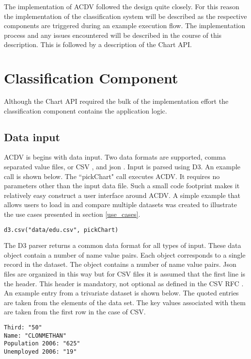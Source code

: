 \documentclass[a4paper, 11pt, titlepage, onehalfspacing]{report}
\begin{document}
The implementation of AC\lightning{}DV followed the design quite closely. For this reason the implementation of the classification system will be described as the respective components are triggered during an example execution flow. The implementation process and any issues encountered will be described in the course of this description. This is followed by a description of the Chart API.

\section{Classification Component}
Although the Chart API required the bulk of the implementation effort the classification component contains the application logic.

\subsection{Data input}
AC\lightning{}DV is begins with data input. Two data formats are supported, comma separated value files, or CSV \cite{csv}, and json \cite{json}. Input is parsed using D3. An example call is shown below. The ``pickChart" call executes AC\lightning{}DV. It requires no parameters other than the input data file. Such a small code footprint makes it relatively easy construct a user interface around AC\lightning{}DV. A simple example that allows users to load in and compare multiple datasets was created to illustrate the use cases presented in section \ref{use_cases}. 

\begin{verbatim}
d3.csv("data/edu.csv", pickChart)
\end{verbatim}

The D3 parser returns a common data format for all types of input. These data object contain a number of name value pairs. Each object corresponds to a single record in the dataset. The object contains a number of name value pairs. Json files are organized in this way but for CSV files it is assumed that the first line is the header. This header is mandatory, not optional as defined in the CSV RFC \cite{csv}. An example entry from a trivariate dataset is shown below. The quoted entries are taken from the elements of the data set. The key values associated with them are taken from the first row in the case of CSV.



\begin{verbatim}
Third: "50"
Name: "CLONMETHAN"
Population 2006: "625"
Unemployed 2006: "19"
\end{verbatim}
\end{document}
